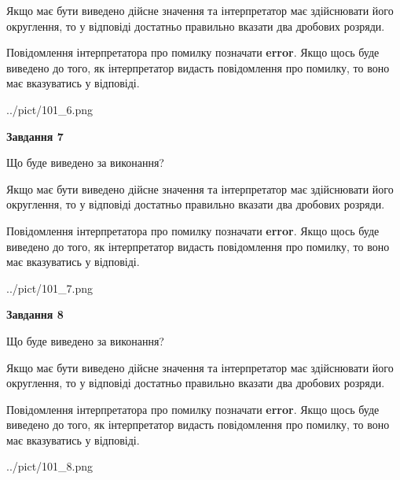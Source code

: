 \documentclass[12pt, ukrainian]{article}
\begin{document}
{\begin {Large}
Якщо має бути виведено дійсне значення та інтерпретатор має здійснювати його округлення, 
то у відповіді достатньо правильно вказати два дробових розряди.

Повідомлення інтерпретатора про помилку позначати \textbf{error}.
Якщо щось буде виведено до того, як інтерпретатор видасть повідомлення про помилку, 
то воно має вказуватись у відповіді. \par

\begin{center}
	{../pict/101_6.png}
\end{center}
\newpage

{\begin {center}\textbf{Завдання 7}\end {center}}\par
Що буде виведено за виконання? \par

Якщо має бути виведено дійсне значення та інтерпретатор має здійснювати його округлення, 
то у відповіді достатньо правильно вказати два дробових розряди.

Повідомлення інтерпретатора про помилку позначати \textbf{error}.
Якщо щось буде виведено до того, як інтерпретатор видасть повідомлення про помилку, 
то воно має вказуватись у відповіді. \par

\begin{center}
	{../pict/101_7.png}
\end{center}
\newpage

{\begin {center}\textbf{Завдання 8}\end {center}}\par
Що буде виведено за виконання? \par

Якщо має бути виведено дійсне значення та інтерпретатор має здійснювати його округлення, 
то у відповіді достатньо правильно вказати два дробових розряди.

Повідомлення інтерпретатора про помилку позначати \textbf{error}.
Якщо щось буде виведено до того, як інтерпретатор видасть повідомлення про помилку, 
то воно має вказуватись у відповіді. \par

\begin{center}
	{../pict/101_8.png}
\end{center}
\newpage


\end{Large}}
\end{document}
